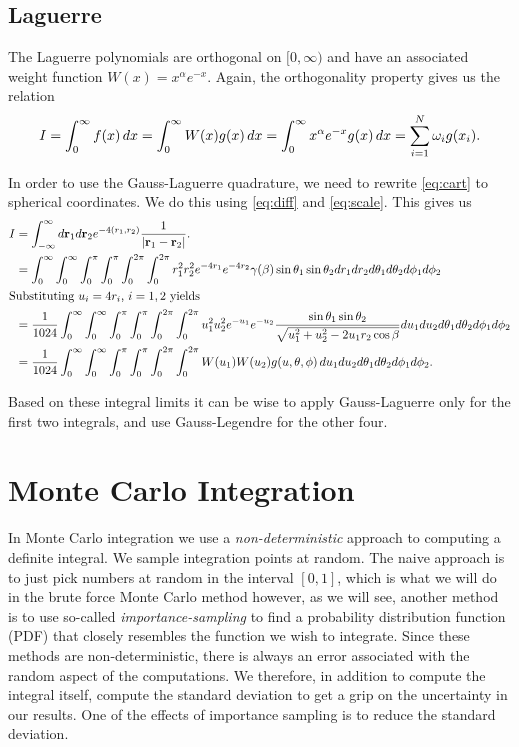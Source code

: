 \documentclass[intlimits]{amsart}
\renewcommand{\v}[1]{\mathbf{#1}}
\newcommand{\intlimits}{\int_{0}^\infty\int_0^\infty\int_0^{\pi}\int_0^\pi\int_0^{2\pi}\int_0^{2\pi}}
\begin{document}
\subsection{Laguerre}
\label{sub:laguerre_polynomials}

The Laguerre polynomials are orthogonal on $[0, \infty)$ and have an associated
weight function $W(x) = x^\alpha e^{-x}$. Again, the orthogonality property gives us the relation
\begin{equation}
  \notag I = \int_0^\infty f(x) \, dx = \int_0^\infty W(x)g(x) \, dx =
  \int_0^\infty x^\alpha e^{-x} g(x) \, dx = \sum^{N}_{i=1} \omega_ig(x_i).
\end{equation}

In order to use the Gauss-Laguerre quadrature, we need to rewrite
\cref{eq:cart} to spherical coordinates. We do this using \cref{eq:diff} and
\cref{eq:scale}. This gives us
\begin{align*}
  I &= \int_{-\infty}^{\infty} d\v{r}_1d\v{r}_2 e^{-4(r_1, r_2)} \frac{1}{\left| \v{r}_1 - \v{r}_2 \right|}.\\
    &= \intlimits r_1^2r_2^2e^{-4r_1} e^{-4r_2} \gamma(\beta)\sin\theta_1\sin\theta_2 dr_1dr_2d\theta_1d\theta_2d\phi_1d\phi_2\\
  \intertext{Substituting $u_i = 4r_i$, $i = 1, 2$ yields}
  &= \frac{1}{1024}\intlimits u_1^2u_2^2e^{-u_1}e^{-u_2} \frac{\sin\theta_1\sin\theta_2}{\sqrt{u_1^2 + u_2^2 - 2u_1r_2\cos\beta}} du_1du_2d\theta_1d\theta_2d\phi_1d\phi_2\\
    &=\frac{1}{1024} \int_{0}^\infty\int_0^\infty\int_0^{\pi}\int_0^\pi\int_0^{2\pi}\int_0^{2\pi}W(u_1)W(u_2)g(u, \theta, \phi)\,du_1du_2d\theta_1d\theta_2d\phi_1d\phi_2.
\end{align*}

Based on these integral limits it can be wise to apply Gauss-Laguerre only for
the first two integrals, and use Gauss-Legendre for the other four.

\section{Monte Carlo Integration}
\label{sec:monte_carlo_integration}

In Monte Carlo integration we use a \emph{non-deterministic} approach to
computing a definite integral. We sample integration points at random. The
naive approach is to just pick numbers at random in the interval $[0, 1]$,
which is what we will do in the brute force Monte Carlo method however, as we
will see, another method is to use so-called \emph{importance-sampling} to find
a probability distribution function (PDF) that closely resembles the function
we wish to integrate. Since these methods are non-deterministic, there is
always an error associated with the random aspect of the computations. We
therefore, in addition to compute the integral itself, compute the standard
deviation to get a grip on the uncertainty in our results. One of the effects
of importance sampling is to reduce the standard deviation.
\end{document}

